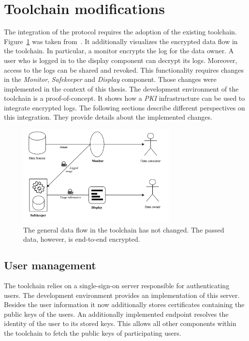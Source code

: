 \documentclass[../main.tex]{subfiles}
\begin{document}
\section{Toolchain modifications}
\label{sec:toolchain-modifications}
The integration of the protocol requires the adoption of the existing toolchain.
Figure~\ref{fig:encrypted-toolchain} was taken from~\cite{Zieglmeier2021}.
It additionally visualizes the encrypted data flow in the toolchain.
In particular, a monitor encrypts the log for the data owner.
A user who is logged in to the display component can decrypt its logs.
Moreover, access to the logs can be shared and revoked.
This functionality requires changes in the \emph{Monitor}, \emph{Safekeeper} and \emph{Display} component.
Those changes were implemented in the context of this thesis.
The development environment of the toolchain is a proof-of-concept.
It shows how a \emph{PKI} infrastructure can be used to integrate encrypted logs.
The following sections describe different perspectives on this integration.
They provide details about the implemented changes.


\begin{figure}[h!]
    \includegraphics[width=8cm]{../img/06/encrypted_toolchain.jpg}
    \centering
    \caption{The general data flow in the toolchain has not changed. The passed data, however, is end-to-end encrypted.}
    \label{fig:encrypted-toolchain}
\end{figure}

\subsection{User management}
The toolchain relies on a single-sign-on server responsible for authenticating users.
The development environment provides an implementation of this server.
Besides the user information it now additionally stores certificates containing the public keys of the users.
An additionally implemented endpoint resolves the identity of the user to its stored keys.
This allows all other components within the toolchain to fetch the public keys of participating users.
\end{document}
